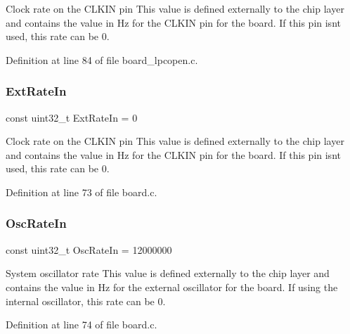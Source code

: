 Clock rate on the C\+L\+K\+IN pin This value is defined externally to the chip layer and contains the value in Hz for the C\+L\+K\+IN pin for the board. If this pin isn\textquotesingle{}t used, this rate can be 0. 



Definition at line 84 of file board\+\_\+lpcopen.\+c.

\mbox{\label{group__hal_ga74ceed751e84a920be263a7fe3da67f0}} 
\subsubsection{\texorpdfstring{Ext\+Rate\+In}{ExtRateIn}\hspace{0.1cm}{\footnotesize\ttfamily [2/2]}}
{\footnotesize\ttfamily const uint32\+\_\+t Ext\+Rate\+In = 0}



Clock rate on the C\+L\+K\+IN pin This value is defined externally to the chip layer and contains the value in Hz for the C\+L\+K\+IN pin for the board. If this pin isn\textquotesingle{}t used, this rate can be 0. 



Definition at line 73 of file board.\+c.

\mbox{\label{group__hal_ga2e84f0502f9a7fdd271b97c588696e6f}} 
\subsubsection{\texorpdfstring{Osc\+Rate\+In}{OscRateIn}}
{\footnotesize\ttfamily const uint32\+\_\+t Osc\+Rate\+In = 12000000}



System oscillator rate This value is defined externally to the chip layer and contains the value in Hz for the external oscillator for the board. If using the internal oscillator, this rate can be 0. 



Definition at line 74 of file board.\+c.

